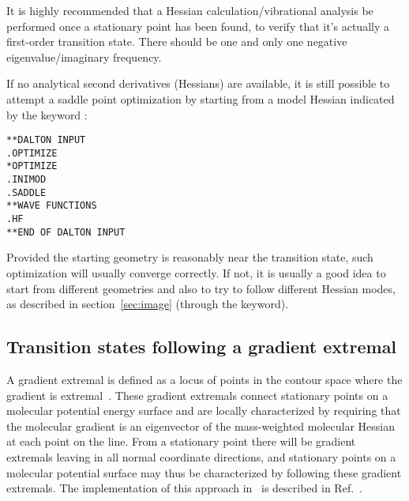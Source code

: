 It is highly recommended that a Hessian calculation/vibrational
analysis be performed once a stationary point has been found, to
verify that it's actually a first-order transition state. There should
be one and only one negative eigenvalue/imaginary frequency.

If no analytical second derivatives (Hessians) are available, it is
still possible to attempt a saddle point optimization by starting from
a model Hessian indicated by the keyword :
\begin{verbatim}
**DALTON INPUT
.OPTIMIZE
*OPTIMIZE
.INIMOD
.SADDLE
**WAVE FUNCTIONS
.HF
**END OF DALTON INPUT
\end{verbatim}
Provided the starting geometry is reasonably near the transition
state, such optimization will usually converge correctly. If not, it
is usually a good idea to start from different geometries and also to
try to follow different Hessian modes, as described in
section~\ref{sec:image} (through the  keyword).



\subsection{Transition states following a gradient
extremal}\label{sec:gradext}

\begin{center}
\end{center}

A gradient extremal is defined as a locus of points in the contour
space where the gradient is extremal~\cite{pjhjajthtca73}. These
gradient extremals connect
stationary points on a molecular potential energy surface and are
locally characterized by requiring that the molecular gradient is an
eigenvector of the mass-weighted molecular Hessian at each point on
the line. From a stationary point there will be gradient extremals
leaving in all normal coordinate directions, and stationary points
on a molecular potential surface may thus be characterized by
following these gradient extremals. The implementation of this approach
in \dalton\ is described in Ref.~\cite{pjhjajthtca73}.

